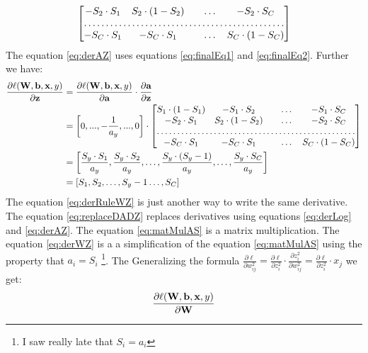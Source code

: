 \documentclass[10pt,a4paper]{article}
\begin{document}
\begin{enumerate}
\begin{align}
\begin{bmatrix}
- S_2 \cdot S_1    & 
S_2 \cdot (1 - S_2)      &  & \dots & -S_2 \cdot S_C \\
    \hdotsfor{5} \\
        -S_C \cdot S_1    & 
-S_C \cdot S_1      &  & \dots & S_C \cdot (1 - S_C) \\
\end{bmatrix}\label{eq:derAZ}
\end{align}
The equation \ref{eq:derAZ} uses equations \ref{eq:finalEq1} and \ref{eq:finalEq2}.
Further we have:
\begin{align}
\frac{\partial \ell(\mat{W}, \vect{b}, \vect{x}, y)}{\partial \vect{z}} &=
\frac{\partial \ell (\mat{W}, \vect{b}, \vect{x}, y)}{\partial \vect{a}}
\cdot \frac{\partial \vect{a}}{\partial \vect{z}}
\label{eq:derRuleWZ}\\
&= \left[0, ..., -\frac{1}{a_y}, ..., 0\right] \cdot 
\begin{bmatrix}
    S_1 \cdot (1- S_1)    & 
-S_1 \cdot S_2      &  & \dots & -S_1\cdot S_C \\
- S_2 \cdot S_1    & 
S_2 \cdot (1 - S_2)      &  & \dots & -S_2 \cdot S_C \\
    \hdotsfor{5} \\
        -S_C \cdot S_1    & 
-S_C \cdot S_1      &  & \dots & S_C \cdot (1 - S_C) \\
\end{bmatrix} 
\label{eq:replaceDADZ}\\
&= \left[ \frac{S_y\cdot S_1 }{a_y},\frac{S_y \cdot S_2 }{a_y}, \dots, \frac{S_y \cdot (S_y - 1) }{a_y}, \dots, \frac{S_y \cdot S_C }{a_y}\right]
\label{eq:matMulAS}\\
&=  \left[ S_1 ,S_2, \dots, S_y - 1 \dots, S_C \right]
\label{eq:derWZ}
\end{align}
The equation \ref{eq:derRuleWZ} is just another way to write the same derivative. 
The equation \ref{eq:replaceDADZ} replaces derivatives using equations \ref{eq:derLog} and \ref{eq:derAZ}. The equation \ref{eq:matMulAS} is a matrix multiplication.  The equation \ref{eq:derWZ} is a a simplification of the equation \ref{eq:matMulAS} using the property that $a_i = S_i$ \footnote{I saw really late that $S_i = a_i$}. The Generalizing the formula $\frac { \partial \ell } { \partial w _ { i j } ^ { 2 } } = \frac { \partial \ell } { \partial z _ { i } ^ { 2 } } \cdot \frac { \partial z _ { i } ^ { 2 } } { \partial w _ { i j } ^ { 2 } } = \frac { \partial \ell } { \partial z _ { i } ^ { 2 } } \cdot x _ { j }$ we get:
\begin{align}
\frac{\partial \ell (\mat{W}, \vect{b}, \vect{x}, y)}{\partial \mat{W}} 

\end{align}
\end{enumerate}
\end{document}
